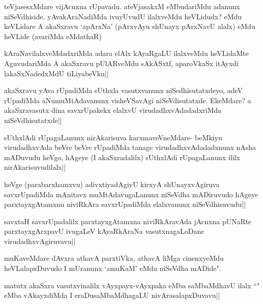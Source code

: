\begin{artha}%
teVjasesxMdare vijAcnxna rUpavadu. ateVjasakxM eMbudariMdu adanunx niSeVdhiside. yAvakAraNadiMda ivuyUvudU ilalxveMdu heVLidudx? eMdu keVLidare A akaSxravu `apArxNa' (pArxvAyu shUnayx pArxNavU alalx) eMdu heVLide (avariMda eMdathaR)
\end{artha}


\begin{artha}
kAraNavilalxveMdadxriMda adara elAlx kAyaRgaLU ilalxveMdu heVLidaMte AguvudariMda A akaSxravu pUlARveMdu sAkASxtf, aparoVkaSx itAyxdi lakaSxNadedxMdU tiLiyabeVku||
\end{artha}

\begin{artha}
akaSxravu yAva rUpadiMda sUthxla vasutxvanunx niSedhisutatxdeyo, adeV rUpadiMda aNumuMtAdavanunx visheVSavAgi niSeVdisutatxde. EkeMdare? a akaSxravasutx dina savxrUpakekx elalxvU virudadhxvAdadadxriMda niSeVdhisutatxde||
\end{artha}

\begin{artha}%
sUthxlAdi rUpagaLanunx nirAkarisuva karxmaveVneMdare- beMkiyu virudadhxvAda beVre beVre rUpadiMda tanage virudadhxvAdadadxnunx nAsha mADuvudu heVgo, hAgeye (I akaSxradalilx) sUthxlAdi rUpagaLanunx ililx nirAkarisuvudilalx||
\end{artha}

\begin{artha}
heVge (parabarxhamxvu) adivxtiyadAgiyU kirxyA shUnayxvAgiruva savxrUpadiMda mAnitavx muMtAdavugaLanunx niSeVdha mADiruvudo hAgeye parxtayxgAtamxnu niviRkAra savxrUpadiMda elalxvanunx niSeVdhisuvudu||
\end{artha}


\begin{artha}
savxtaH savxrUpadalilx parxtayxgAtamxna niviRkAravAda jAcnxna pUNaRte parxtayxgArxpavU ivugaLeV kAyaRkAraNa vasutxnagaLoDane virudadhxvAgiruvavu||
\end{artha}

\begin{artha}
muKaveMdare dAvxra athavA parxtiVka, athavA liMga cinenxyeMdu heVLalapxDuvudo I mUranunx `amuKaM' eMdu niSeVdha mADide".
\end{artha}

\begin{artha}
matutx akaSxra vasutxvinalilx vAyxpayx-vAyxpaka eMba saMbaMdhavU ilalx ``\stext " eMba vAkayxdiMda I eraDusaMbaMdhagaLU nivArasalapxDuvavu||
\end{artha}

